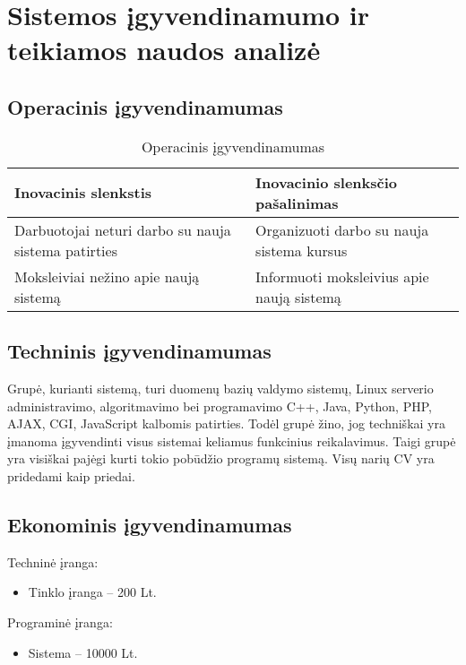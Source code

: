 \chapter{Sistemos \k{i}gyvendinamumo ir teikiamos naudos analiz\.{e}}

\section{Operacinis \k{i}gyvendinamumas}

\begin{table}[h!]
  \centering
  \begin{tabular}{|p{5cm}|p{5cm}|}
  \hline 
  Inovacinis slenkstis & Inovacinio slenks\v{c}io pašalinimas\tabularnewline
  \hline 
  Darbuotojai neturi darbo su nauja sistema patirties & Organizuoti darbo su nauja sistema kursus\tabularnewline
  \hline 
  Moksleiviai nežino apie nauj\k{a} sistem\k{a} & Informuoti moksleivius apie nauj\k{a} sistem\k{a}\tabularnewline
  \hline
  \end{tabular}
  \caption{Operacinis įgyvendinamumas}
  \label{tab:igyv_oper}
\end{table}

\section{Techninis \k{i}gyvendinamumas}

Grupė, kurianti sistemą, turi duomenų bazių valdymo sistemų,
Linux serverio administravimo, algoritmavimo bei programavimo 
C++, Java, Python, PHP, AJAX, CGI, JavaScript kalbomis patirties.
Todėl grupė žino, jog techniškai yra įmanoma įgyvendinti visus sistemai 
keliamus funkcinius reikalavimus. Taigi
grup\.{e} yra visiškai paj\.{e}gi kurti tokio pob\={u}džio program\k{u}
sistem\k{a}. Vis\k{u} nari\k{u} CV yra pridedami kaip priedai. 

\section{Ekonominis \k{i}gyvendinamumas}

Technin\.{e} \k{i}ranga:
\begin{itemize}
  \item Tinklo \k{i}ranga – 200 Lt.
\end{itemize}

Programin\.{e} \k{i}ranga:
\begin{itemize}
  \item Sistema – 10000 Lt.
\end{itemize}

